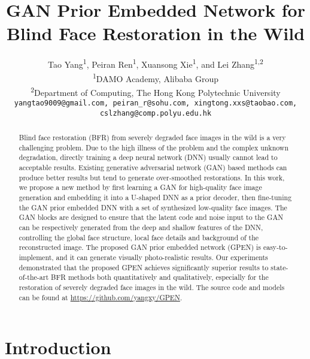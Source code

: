 \documentclass[final]{cvpr}
\newcommand*{\affaddr}[1]{#1} \newcommand*{\affmark}[1][*]{\textsuperscript{#1}}
\newcommand*{\email}[1]{#1}
\begin{document}
\title{GAN Prior Embedded Network for Blind Face Restoration in the Wild}



\author{Tao Yang\affmark[1], Peiran Ren\affmark[1], Xuansong Xie\affmark[1], and Lei Zhang\affmark[1,2]\footnotemark\\
\affaddr{\affmark[1]DAMO Academy, Alibaba Group}\\
\affaddr{\affmark[2]Department of Computing, The Hong Kong Polytechnic University}\\
\email{\tt\small{yangtao9009@gmail.com, peiran\_r@sohu.com, xingtong.xxs@taobao.com, cslzhang@comp.polyu.edu.hk}}\\
}

\maketitle


\begin{abstract}
Blind face restoration (BFR) from severely degraded face images in the wild is a very challenging problem. Due to the high illness of the problem and the complex unknown degradation, directly training a deep neural network (DNN) usually cannot lead to acceptable results. Existing generative adversarial network (GAN) based methods can produce better results but tend to generate over-smoothed restorations. In this work, we propose a new method by first learning a GAN for high-quality face image generation and embedding it into a U-shaped DNN as a prior decoder, then fine-tuning the GAN prior embedded DNN with a set of synthesized low-quality face images. The GAN blocks are designed to ensure that the latent code and noise input to the GAN can be respectively generated from the deep and shallow features of the DNN, controlling the global face structure, local face details and background of the reconstructed image. The proposed GAN prior embedded network (GPEN) is easy-to-implement, and it can generate visually photo-realistic results. Our experiments demonstrated that the proposed GPEN achieves significantly superior results to state-of-the-art BFR methods both quantitatively and qualitatively, especially for the restoration of severely degraded face images in the wild. The source code and models can be found at \url{https://github.com/yangxy/GPEN}. 
\end{abstract}

\section{Introduction}
\end{document}
